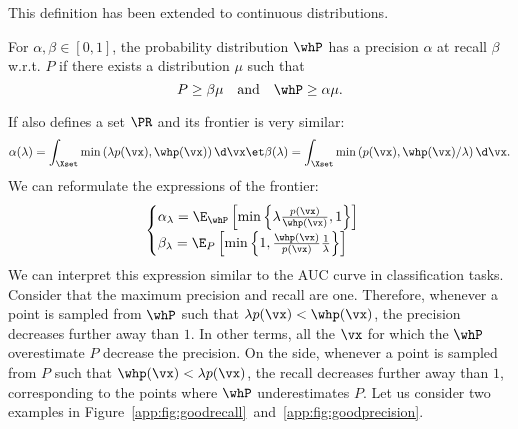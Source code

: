 \documentclass[twoside]{article}
\begin{document}
\newpage 
This definition has been extended to continuous distributions.
\begin{definition}
For $\alpha, \beta \in[0,1]$,  the probability distribution $\whP$ has a precision $\alpha$ at recall $\beta$ w.r.t. $P$ if there exists a distribution $\mu$ such that
$$
P \geq \beta \mu  \quad \mbox{and}\quad \whP  \geq \alpha \mu. $$
\end{definition}
If also defines a set $\PR$ and its  frontier is very similar:
\begin{align*}
    \alpha(\lambda) = \int_\Xset \min\left(\lambda p(\vx), \whp(\vx)\right)\d \vx \et \beta(\lambda) = \int_\Xset \min\left( p(\vx), \whp(\vx)/\lambda\right)\d \vx.
\end{align*}
We can reformulate the expressions of the frontier:
\begin{align}
\begin{cases}
        \alpha_\lambda = \E_{\whP}\left[\min\left\{\lambda \frac{p(\vx)}{\whp(\vx)}, 1\right\}\right] \\[3pt]
        \beta_\lambda =\E_{P}\left[\min\left\{1,\frac{\whp(\vx)}{p(\vx)}\frac{1}{\lambda}\right\}\right]
\end{cases}
\end{align}
We can interpret this expression similar to the AUC curve in classification tasks. Consider that the maximum precision and recall are one. Therefore, whenever a point is sampled from $\whP$ such that $\lambda p (\vx)< \whp(\vx)$, the precision decreases further away than $1$. In other terms, all the $\vx$ for which the $\whP$ overestimate $P$ decrease the precision. On the side,  whenever a point is sampled from $P$ such that $\whp(\vx) < \lambda p (\vx)$, the recall decreases further away than $1$, corresponding to the points where $\whP$ underestimates $P$. Let us consider two examples in Figure~\ref{app:fig:goodrecall}~and~\ref{app:fig:goodprecision}.
\end{document}
